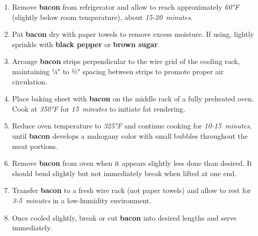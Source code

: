 \documentclass[11pt,letterpaper]{article}
\begin{document}
\begin{enumerate}
    \item Remove \textbf{bacon} from refrigerator and allow to reach approximately \textit{60°F} (slightly below room temperature), about \textit{15-20~minutes}.
    
    \item Pat \textbf{bacon} dry with paper towels to remove excess moisture. If using, lightly sprinkle with \textbf{black pepper} or \textbf{brown sugar}.
    
    \item Arrange \textbf{bacon} strips perpendicular to the wire grid of the cooling rack, maintaining ¼" to ½" spacing between strips to promote proper air circulation.
    
    \item Place baking sheet with \textbf{bacon} on the middle rack of a fully preheated oven. Cook at \textit{350°F} for \textit{15~minutes} to initiate fat rendering.
    
    \item Reduce oven temperature to \textit{325°F} and continue cooking for \textit{10-15~minutes}, until \textbf{bacon} develops a mahogany color with small bubbles throughout the meat portions.
    
    \item Remove \textbf{bacon} from oven when it appears slightly less done than desired. It should bend slightly but not immediately break when lifted at one end.
    
    \item Transfer \textbf{bacon} to a fresh wire rack (not paper towels) and allow to rest for \textit{3-5~minutes} in a low-humidity environment.
    
    \item Once cooled slightly, break or cut \textbf{bacon} into desired lengths and serve immediately.
\end{enumerate}

\newpage
\end{document}
